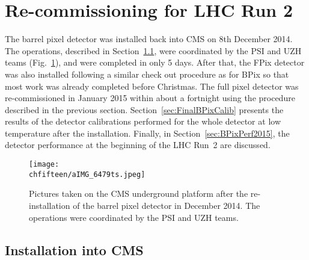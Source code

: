 \section{Re-commissioning for LHC Run 2}\label{sec:commissioning}

The barrel pixel detector was installed back into CMS on 8th December 2014.
The operations, described in Section~\ref{sec:BPixInst}, were coordinated by the PSI and UZH teams (Fig.~\ref{fig:BPixInst}), and were completed in only 5 days.
After that, the FPix detector was also installed following a similar check out procedure as for BPix so that most work was already completed before Christmas.
The full pixel detector was re-commissioned in January 2015 within about a fortnight using the procedure described in the previous section.
Section~\ref{sec:FinalBPixCalib} presents the results of the detector calibrations performed for the whole detector at low temperature after the installation.
Finally, in Section~\ref{sec:BPixPerf2015}, the detector performance at the beginning of the LHC Run~2 are discussed.

\begin{figure}[!htb]
 \begin{center}
 \texttt{[image: \\chfifteen/aIMG\_6479ts.jpeg]}
 \end{center}
 \caption{Pictures taken on the CMS underground platform after the re-installation of the barrel pixel detector in December 2014. The operations were coordinated by the PSI and UZH teams.}
 \label{fig:BPixInst}
\end{figure}

\subsection{Installation into CMS}\label{sec:BPixInst}

